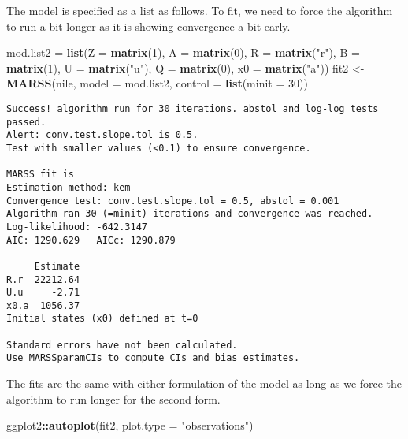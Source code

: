 \documentclass[12pt,]{book}
\newenvironment{Shaded}{\begin{snugshade}}{\end{snugshade}}
\newcommand{\DataTypeTok}[1]{\textcolor[rgb]{0.13,0.29,0.53}{#1}}
\newcommand{\DecValTok}[1]{\textcolor[rgb]{0.00,0.00,0.81}{#1}}
\newcommand{\KeywordTok}[1]{\textcolor[rgb]{0.13,0.29,0.53}{\textbf{#1}}}
\newcommand{\NormalTok}[1]{#1}
\newcommand{\OperatorTok}[1]{\textcolor[rgb]{0.81,0.36,0.00}{\textbf{#1}}}
\newcommand{\StringTok}[1]{\textcolor[rgb]{0.31,0.60,0.02}{#1}}
\begin{document}
The model is specified as a list as follows. To fit, we need to force the algorithm to run a bit longer as it is showing convergence a bit early.

\begin{Shaded}
\begin{Highlighting}[]
\NormalTok{mod.list2 =}\StringTok{ }\KeywordTok{list}\NormalTok{(}\DataTypeTok{Z =} \KeywordTok{matrix}\NormalTok{(}\DecValTok{1}\NormalTok{), }\DataTypeTok{A =} \KeywordTok{matrix}\NormalTok{(}\DecValTok{0}\NormalTok{), }\DataTypeTok{R =} \KeywordTok{matrix}\NormalTok{(}\StringTok{"r"}\NormalTok{), }
    \DataTypeTok{B =} \KeywordTok{matrix}\NormalTok{(}\DecValTok{1}\NormalTok{), }\DataTypeTok{U =} \KeywordTok{matrix}\NormalTok{(}\StringTok{"u"}\NormalTok{), }\DataTypeTok{Q =} \KeywordTok{matrix}\NormalTok{(}\DecValTok{0}\NormalTok{), }\DataTypeTok{x0 =} \KeywordTok{matrix}\NormalTok{(}\StringTok{"a"}\NormalTok{))}
\NormalTok{fit2 <-}\StringTok{ }\KeywordTok{MARSS}\NormalTok{(nile, }\DataTypeTok{model =}\NormalTok{ mod.list2, }\DataTypeTok{control =} \KeywordTok{list}\NormalTok{(}\DataTypeTok{minit =} \DecValTok{30}\NormalTok{))}
\end{Highlighting}
\end{Shaded}

\begin{verbatim}
Success! algorithm run for 30 iterations. abstol and log-log tests passed.
Alert: conv.test.slope.tol is 0.5.
Test with smaller values (<0.1) to ensure convergence.

MARSS fit is
Estimation method: kem 
Convergence test: conv.test.slope.tol = 0.5, abstol = 0.001
Algorithm ran 30 (=minit) iterations and convergence was reached. 
Log-likelihood: -642.3147 
AIC: 1290.629   AICc: 1290.879   
 
     Estimate
R.r  22212.64
U.u     -2.71
x0.a  1056.37
Initial states (x0) defined at t=0

Standard errors have not been calculated. 
Use MARSSparamCIs to compute CIs and bias estimates.
\end{verbatim}

The fits are the same with either formulation of the model as long as we force the algorithm to run longer for the second form.

\begin{Shaded}
\begin{Highlighting}[]
\NormalTok{ggplot2}\OperatorTok{::}\KeywordTok{autoplot}\NormalTok{(fit2, }\DataTypeTok{plot.type =} \StringTok{"observations"}\NormalTok{)}
\end{Highlighting}
\end{Shaded}
\end{document}

